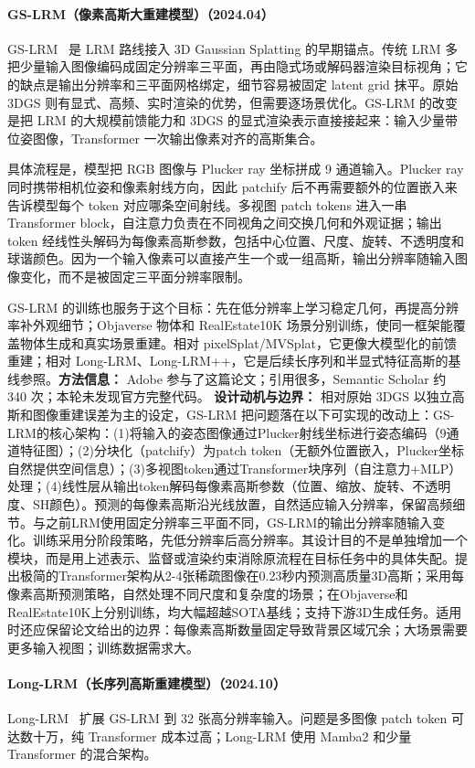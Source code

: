 \paragraph{GS-LRM（像素高斯大重建模型）（2024.04）}
GS-LRM~\cite{2404_19702} 是 LRM 路线接入 3D Gaussian Splatting 的早期锚点。传统 LRM 多把少量输入图像编码成固定分辨率三平面，再由隐式场或解码器渲染目标视角；它的缺点是输出分辨率和三平面网格绑定，细节容易被固定 latent grid 抹平。原始 3DGS 则有显式、高频、实时渲染的优势，但需要逐场景优化。GS-LRM 的改变是把 LRM 的大规模前馈能力和 3DGS 的显式渲染表示直接接起来：输入少量带位姿图像，Transformer 一次输出像素对齐的高斯集合。

具体流程是，模型把 RGB 图像与 Plucker ray 坐标拼成 9 通道输入。Plucker ray 同时携带相机位姿和像素射线方向，因此 patchify 后不再需要额外的位置嵌入来告诉模型每个 token 对应哪条空间射线。多视图 patch tokens 进入一串 Transformer block，自注意力负责在不同视角之间交换几何和外观证据；输出 token 经线性头解码为每像素高斯参数，包括中心位置、尺度、旋转、不透明度和球谐颜色。因为一个输入像素可以直接产生一个或一组高斯，输出分辨率随输入图像变化，而不是被固定三平面分辨率限制。

GS-LRM 的训练也服务于这个目标：先在低分辨率上学习稳定几何，再提高分辨率补外观细节；Objaverse 物体和 RealEstate10K 场景分别训练，使同一框架能覆盖物体生成和真实场景重建。相对 pixelSplat/MVSplat，它更像大模型化的前馈重建；相对 Long-LRM、Long-LRM++，它是后续长序列和半显式特征高斯的基线参照。\textbf{方法信息：} Adobe 参与了这篇论文；引用很多，Semantic Scholar 约 340 次；本轮未发现官方完整代码。
\textbf{设计动机与边界：} 相对原始 3DGS 以独立高斯和图像重建误差为主的设定，GS-LRM 把问题落在以下可实现的改动上：GS-LRM的核心架构：(1)将输入的姿态图像通过Plucker射线坐标进行姿态编码（9通道特征图）；(2)分块化（patchify）为patch token（无额外位置嵌入，Plucker坐标自然提供空间信息）；(3)多视图token通过Transformer块序列（自注意力+MLP）处理；(4)线性层从输出token解码每像素高斯参数（位置、缩放、旋转、不透明度、SH颜色）。预测的每像素高斯沿光线放置，自然适应输入分辨率，保留高频细节。与之前LRM使用固定分辨率三平面不同，GS-LRM的输出分辨率随输入变化。训练采用分阶段策略，先低分辨率后高分辨率。其设计目的不是单独增加一个模块，而是用上述表示、监督或渲染约束消除原流程在目标任务中的具体失配。提出极简的Transformer架构从2-4张稀疏图像在0.23秒内预测高质量3D高斯；采用每像素高斯预测策略，自然处理不同尺度和复杂度的场景；在Objaverse和RealEstate10K上分别训练，均大幅超越SOTA基线；支持下游3D生成任务。适用时还应保留论文给出的边界：每像素高斯数量固定导致背景区域冗余；大场景需要更多输入视图；训练数据需求大。
\paragraph{Long-LRM（长序列高斯重建模型）（2024.10）}
Long-LRM~\cite{2410_12781} 扩展 GS-LRM 到 32 张高分辨率输入。问题是多图像 patch token 可达数十万，纯 Transformer 成本过高；Long-LRM 使用 Mamba2 和少量 Transformer 的混合架构。

